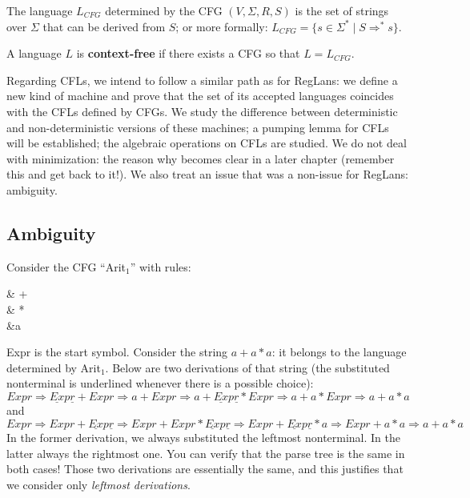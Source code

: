 \begin{definition}
The language $L_{CFG}$ determined by the CFG $(V,\Sigma,R,S)$ is the
set of strings over $\Sigma$ that can be derived from $S$; or more
formally: $L_{CFG} = \{s \in \Sigma^* \mid S \Rightarrow^* s\}$.
\end{definition}

\begin{definition}
A language $L$ is {\bf context-free} if there exists a CFG so that $L
= L_{CFG}$.
\end{definition}

Regarding CFLs, we intend to follow a similar path as for RegLans: we
define a new kind of machine and prove that the set of its accepted
languages coincides with the CFLs defined by CFGs. We study the
difference between deterministic and non-deterministic versions of
these machines; a pumping lemma for CFLs will be established; the
algebraic operations on CFLs are studied. We do not deal with
minimization: the reason why becomes clear in a later chapter
(remember this and get back to it!). We also treat an issue that was
a non-issue for RegLans: ambiguity.

\subsection{Ambiguity}
Consider the CFG ``Arit${}_1$'' with rules:
\begin{grammar}\label{arit1label}
	 &\rpijl {} +  \\
	 &\rpijl {}  \\
	 &\rpijl a
\end{grammar}
Expr is the start symbol. Consider the string $a+a*a$: it belongs to
the language determined by Arit${}_1$. Below are two derivations of that
string (the substituted nonterminal is underlined whenever there is a
possible choice):
\begin{equation*}
	Expr \Rightarrow \underline{Ex}p\underline{r} + Expr \Rightarrow a + Expr \Rightarrow a + \underline{Ex}p\underline{r} * Expr \Rightarrow a + a * Expr \Rightarrow a + a * a
\end{equation*}
and
\begin{equation*}
	Expr \Rightarrow Expr + \underline{Ex}p\underline{r} \Rightarrow Expr + Expr * \underline{Ex}p\underline{r} \Rightarrow Expr + \underline{Ex}p\underline{r} * a \Rightarrow Expr + a * a \Rightarrow a + a * a
\end{equation*}
In the former derivation, we always substituted the leftmost
nonterminal. In the latter always the rightmost one. You can verify that the parse
tree is the same in both cases! Those two derivations
are essentially the same, and this justifies that we consider only
\emph{leftmost derivations}.

